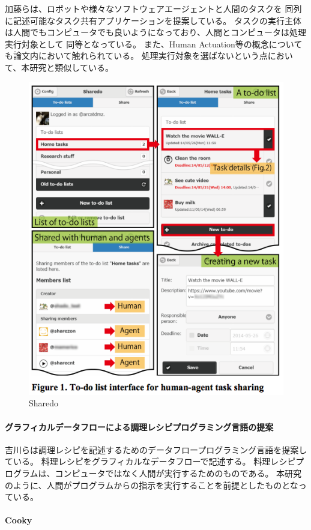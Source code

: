 加藤ら\cite{sharedo}は、ロボットや様々なソフトウェアエージェントと人間のタスクを
同列に記述可能なタスク共有アプリケーションを提案している。
タスクの実行主体は人間でもコンピュータでも良いようになっており、人間とコンピュータは処理実行対象として
同等となっている。 また、Human
Actuation等の概念についても論文内において触れられている。
処理実行対象を選ばないという点において、本研究と類似している。

\begin{figure}[htbp]
  \begin{center}
  \includegraphics[width=.5\linewidth,bb=0 0 497 611]{images/sharedo.png}
  \end{center}
  \caption{Sharedo}
  \label{fig:sharedo}
\end{figure}

\paragraph{グラフィカルデータフローによる調理レシピプログラミング言語の提案}\label{ux30b0ux30e9ux30d5ux30a3ux30abux30ebux30c7ux30fcux30bfux30d5ux30edux30fcux306bux3088ux308bux8abfux7406ux30ecux30b7ux30d4ux30d7ux30edux30b0ux30e9ux30dfux30f3ux30b0ux8a00ux8a9eux306eux63d0ux6848}

\mbox{}

吉川らは調理レシピを記述するためのデータフロープログラミング言語を提案している\cite{recipe-programming}。
料理レシピをグラフィカルなデータフローで記述する。
料理レシピプログラムは、コンピュータではなく人間が実行するためのものである。
本研究のように、人間がプログラムからの指示を実行することを前提としたものとなっている。

\paragraph{Cooky}\label{cooky}

